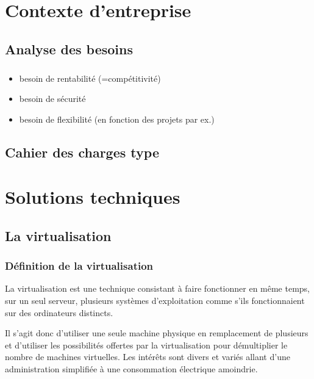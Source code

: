\documentclass[a4paper,12pt]{report}
\begin{document}
\begin{onehalfspace}
	\chapter{Contexte d’entreprise}
	
	\section{Analyse des besoins}
	

	\paragraph*{}
	\begin{itemize}
		\item besoin de rentabilité (=compétitivité)
		\item besoin de sécurité
		\item besoin de flexibilité (en fonction des projets par ex.)
	\end{itemize}

	\section{Cahier des charges type}
	


	\chapter{Solutions techniques}
	
	\section{La virtualisation}
	
	\subsection{Définition de la virtualisation}
	La virtualisation est une technique consistant à faire fonctionner en même temps, sur un seul serveur, plusieurs systèmes d'exploitation comme s'ils fonctionnaient sur des ordinateurs distincts.
	
	 Il s’agit donc d’utiliser une seule machine physique en remplacement de plusieurs et d’utiliser les possibilités offertes par la virtualisation pour démultiplier le nombre de machines virtuelles. Les intérêts sont divers et variés allant d’une administration simplifiée à une consommation électrique amoindrie.
	 

\end{onehalfspace}
\end{document}
